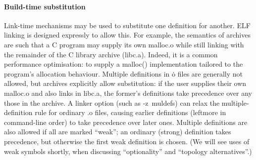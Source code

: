 
\paragraph{Build-time substitution}\label{sec:substitution}
Link-time mechanisms may be used to substitute one definition for another.
ELF linking is designed expressly to allow this.
For example, the semantics of archives are such that a C program
may supply its own \textsf{malloc.o} while still linking with 
the remainder of the C library archive (\textsf{libc.a}).
Indeed, it is a common performance optimisation: to supply a 
\textsf{malloc()} implementation tailored to the program's allocation behaviour.
Multiple definitions in \textsf{\.o} files are generally not allowed, but archives
explicitly allow substitution: if the user supplies their own \textsf{malloc.o} and also links in \textsf{libc.a}, the former's definitions take precedence over any those in the archive.
A linker option (such as \textsf{-z~muldefs}) can relax the multiple-definition rule for 
ordinary \textsf{.o} files, causing earlier definitions (leftmore in command-line order) to take precedence over later ones.
Multiple definitions are also allowed if all are marked ``weak'';
an ordinary (strong) definition takes precedence, but otherwise the first weak definition is  chosen.
(We will see uses of weak symbols shortly, when discussing 
``optionality'' and ``topology alternatives''.)

